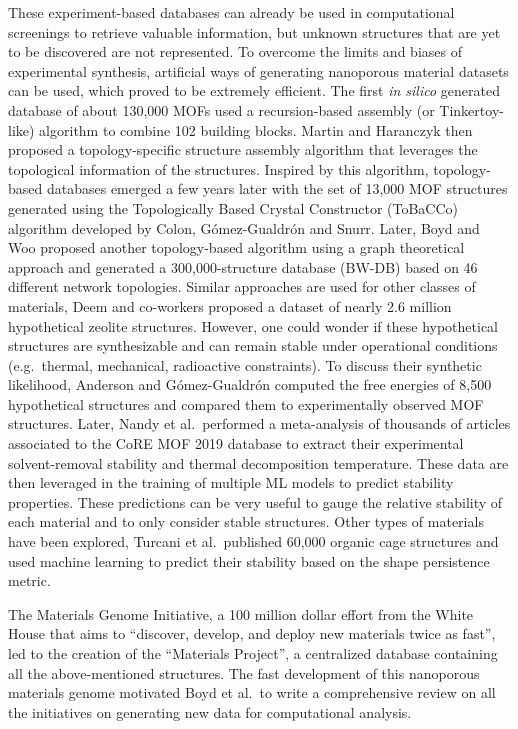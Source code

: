 \documentclass[main.tex]{subfiles}
\begin{document}
These experiment-based databases can already be used in computational screenings to retrieve valuable information, but unknown structures that are yet to be discovered are not represented. To overcome the limits and biases of experimental synthesis, artificial ways of generating nanoporous material datasets can be used, which proved to be extremely efficient. The first \emph{in silico} generated database of about 130,000 MOFs used a recursion-based assembly (or Tinkertoy-like) algorithm to combine 102 building blocks.\cite{Wilmer_2012} Martin and Haranczyk then proposed a topology-specific structure assembly algorithm that leverages the topological information of the structures.\cite{Martin_2014} Inspired by this algorithm, topology-based databases emerged a few years later with the set of 13,000 MOF structures generated using the Topologically Based Crystal Constructor (ToBaCCo) algorithm developed by Colon, G{\'{o}}mez-Gualdr{\'{o}}n and Snurr.\cite{Colon_2017} Later, Boyd and Woo proposed another topology-based algorithm using a graph theoretical approach and generated a 300,000-structure database (BW-DB) based on 46 different network topologies.\cite{Boyd_2016} Similar approaches are used for other classes of materials, Deem and co-workers proposed a dataset of nearly 2.6 million hypothetical zeolite structures.\cite{Earl_2006,Deem_2009,Pophale_2011} However, one could wonder if these hypothetical structures are synthesizable and can remain stable under operational conditions (e.g.\ thermal, mechanical, radioactive constraints). To discuss their synthetic likelihood, Anderson and G{\'{o}}mez-Gualdr{\'{o}}n computed the free energies of 8,500 hypothetical structures and compared them to experimentally observed MOF structures.\cite{Anderson_2020} Later, Nandy et al.\ performed a meta-analysis of thousands of articles associated to the CoRE MOF 2019 database to extract their experimental solvent-removal stability and thermal decomposition temperature.\cite{Nandy_2021} These data are then leveraged in the training of multiple ML models to predict stability properties. These predictions can be very useful to gauge the relative stability of each material and to only consider stable structures. Other types of materials have been explored, Turcani et al.\ published 60,000 organic cage structures and used machine learning to predict their stability based on the shape persistence metric.\cite{Turcani_2018}

The Materials Genome Initiative, a 100 million dollar effort from the White House that aims to ``discover, develop, and deploy new materials twice as fast'', led to the creation of the ``Materials Project'', a centralized database containing all the above-mentioned structures.\cite{kalil2011national,Matgenome,Jain_2013}
The fast development of this nanoporous materials genome motivated Boyd et al.\ to write a comprehensive review on all the initiatives on generating new data for computational analysis.\cite{Boyd_2017}
\end{document}

